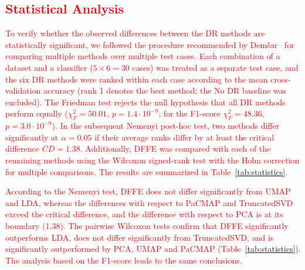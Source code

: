 \documentclass[a4paper,fleqn]{cas-dc}
\begin{document}
\subsection{\textcolor{red}{Statistical Analysis}}\label{sec-statistics}

\textcolor{red}{To verify whether the observed differences between the DR methods are statistically significant, we followed the procedure recommended by Dem\v{s}ar~\cite{demsar2006} for comparing multiple methods over multiple test cases. Each combination of a dataset and a classifier ($5 \times 6 = 30$ cases) was treated as a separate test case, and the six DR methods were ranked within each case according to the mean cross-validation accuracy (rank 1 denotes the best method; the No DR baseline was excluded). The Friedman test rejects the null hypothesis that all DR methods perform equally ($\chi^2_F = 50.01$, $p = 1.4 \cdot 10^{-9}$; for the F1-score $\chi^2_F = 48.36$, $p = 3.0 \cdot 10^{-9}$). In the subsequent Nemenyi post-hoc test, two methods differ significantly at $\alpha = 0.05$ if their average ranks differ by at least the critical difference $CD = 1.38$. Additionally, DFFE was compared with each of the remaining methods using the Wilcoxon signed-rank test with the Holm correction for multiple comparisons. The results are summarized in Table~\ref{tab:statistics}.}

\textcolor{red}{According to the Nemenyi test, DFFE does not differ significantly from UMAP and LDA, whereas the differences with respect to PaCMAP and TruncatedSVD exceed the critical difference, and the difference with respect to PCA is at its boundary (1.38). The pairwise Wilcoxon tests confirm that DFFE significantly outperforms LDA, does not differ significantly from TruncatedSVD, and is significantly outperformed by PCA, UMAP and PaCMAP (Table~\ref{tab:statistics}). The analysis based on the F1-score leads to the same conclusions.}
\end{document}

